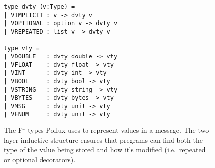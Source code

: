 \documentclass[11pt]{article}
\theoremstyle{definition}
\theoremstyle{plain}
\newcommand{\fstar}{F$^\star$}
\begin{document}
\begin{figure}[H]
  \centering
\begin{lstlisting}[language=caml]
type dvty (v:Type) =
| VIMPLICIT : v -> dvty v
| VOPTIONAL : option v -> dvty v 
| VREPEATED : list v -> dvty v

type vty = 
| VDOUBLE   : dvty double -> vty
| VFLOAT    : dvty float -> vty
| VINT      : dvty int -> vty 
| VBOOL     : dvty bool -> vty 
| VSTRING   : dvty string -> vty 
| VBYTES    : dvty bytes -> vty 
| VMSG      : dvty unit -> vty
| VENUM     : dvty unit -> vty
\end{lstlisting}

  \caption[]{The \fstar{} types Pollux uses to represent values in a
    message. The two-layer inductive structure ensures that programs can find
    both the type of the value being stored and how it's modified (i.e.\
    repeated or optional decorators).}
  \label{fig:fstar-proto-val-type}
\end{figure}
\end{document}
